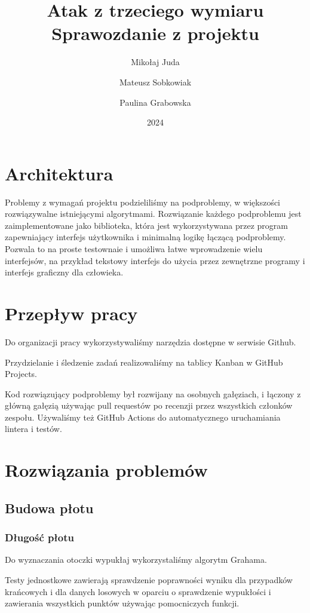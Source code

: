 \documentclass{article}
\title{Atak z trzeciego wymiaru \\\large Sprawozdanie z projektu}
\author{Mikołaj Juda \and Mateusz Sobkowiak \and Paulina Grabowska}
\date{2024}
\begin{document}
\maketitle

\section{Architektura}
Problemy z wymagań projektu podzieliliśmy na podproblemy, w większości
rozwiązywalne istniejącymi algorytmami.
Rozwiązanie każdego podproblemu jest zaimplementowane jako biblioteka,
która jest wykorzystywana przez program zapewniający interfejs użytkownika
i minimalną logikę łączącą podproblemy. Pozwala to na proste testownaie
i umożliwa łatwe wprowadzenie wielu interfejsów, na przykład
tekstowy interfejs do użycia przez zewnętrzne programy i interfejs graficzny dla człowieka.

\section{Przepływ pracy}
Do organizacji pracy wykorzystywaliśmy narzędzia dostępne w serwisie Github.

\noindent Przydzielanie i śledzenie zadań realizowaliśmy na tablicy Kanban w GitHub Projects.

\noindent Kod rozwiązujący podproblemy był rozwijany na osobnych gałęziach,
i łączony z główną gałęzią używając pull requestów po recenzji przez wszystkich członków zespołu.
Używaliśmy też GitHub Actions do automatycznego uruchamiania lintera i testów.

\section{Rozwiązania problemów}

\subsection{Budowa płotu}

\subsubsection{Długość płotu}
Do wyznaczania otoczki wypukłaj wykorzystaliśmy algorytm Grahama.

\noindent Testy jednostkowe zawierają sprawdzenie poprawności wyniku dla przypadków krańcowych
i dla danych losowych w oparciu o sprawdzenie wypukłości i zawierania wszystkich punktów
używając pomocniczych funkcji.
\end{document}
